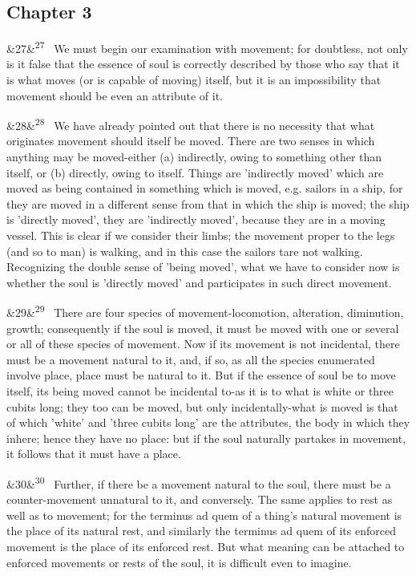 \documentclass[12pt]{article}
\newcommand{\para}[1][]{\par\noindent\ifx&#1&\else\textsuperscript{\footnotesize #1}~\fi}
\begin{document}
\subsection*{Chapter 3}

\para[27] We must begin our examination with movement; for doubtless, not only is it false that the essence of soul is correctly described by those who say that it is what moves (or is capable of moving) itself, but it is an impossibility that movement should be even an attribute of it.

\para[28] We have already pointed out that there is no necessity that what originates movement should itself be moved. There are two senses in which anything may be moved-either (a) indirectly, owing to something other than itself, or (b) directly, owing to itself. Things are 'indirectly moved' which are moved as being contained in something which is moved, e.g. sailors in a ship, for they are moved in a different sense from that in which the ship is moved; the ship is 'directly moved', they are 'indirectly moved', because they are in a moving vessel. This is clear if we consider their limbs; the movement proper to the legs (and so to man) is walking, and in this case the sailors tare not walking. Recognizing the double sense of 'being moved', what we have to consider now is whether the soul is 'directly moved' and participates in such direct movement.

\para[29] There are four species of movement-locomotion, alteration, diminution, growth; consequently if the soul is moved, it must be moved with one or several or all of these species of movement. Now if its movement is not incidental, there must be a movement natural to it, and, if so, as all the species enumerated involve place, place must be natural to it. But if the essence of soul be to move itself, its being moved cannot be incidental to-as it is to what is white or three cubits long; they too can be moved, but only incidentally-what is moved is that of which 'white' and 'three cubits long' are the attributes, the body in which they inhere; hence they have no place: but if the soul naturally partakes in movement, it follows that it must have a place.

\para[30] Further, if there be a movement natural to the soul, there must be a counter-movement unnatural to it, and conversely. The same applies to rest as well as to movement; for the terminus ad quem of a thing's natural movement is the place of its natural rest, and similarly the terminus ad quem of its enforced movement is the place of its enforced rest. But what meaning can be attached to enforced movements or rests of the soul, it is difficult even to imagine.
\end{document}
